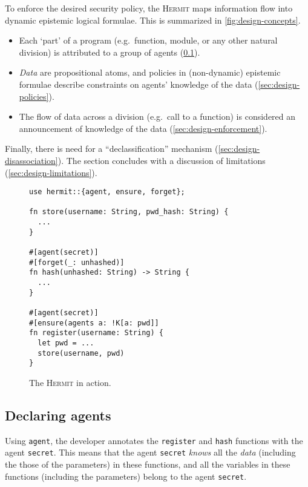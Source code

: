 \documentclass[letterpaper,twocolumn,10pt]{article}
\newcommand{\Hermit}{\textsc{Hermit}\xspace}
\begin{document}
To enforce the desired security policy, the \Hermit maps information flow into dynamic epistemic logical formulae.
This is summarized in \cref{fig:design-concepts}.
%
\begin{itemize}
  \item Each `part' of a program (e.g.\ function, module, or any other natural division) is attributed to a group of agents (\cref{sec:design-agents}).

  \item \emph{Data} are propositional atoms, and policies in (non-dynamic) epistemic formulae describe constraints on agents' knowledge of the data (\cref{sec:design-policies}).

  \item The flow of data across a division (e.g.\ call to a function) is considered an announcement of knowledge of the data (\cref{sec:design-enforcement}).
\end{itemize}
%
Finally, there is need for a ``declassification'' mechanism (\cref{sec:design-disassociation}).
The section concludes with a discussion of limitations (\cref{sec:design-limitations}).

\begin{figure}
  \centering
  \begin{lstlisting}
use hermit::{agent, ensure, forget};

fn store(username: String, pwd_hash: String) {
  ...
}

#[agent(secret)]
#[forget(_: unhashed)]
fn hash(unhashed: String) -> String {
  ...
}

#[agent(secret)]
#[ensure(agents a: !K[a: pwd]]
fn register(username: String) {
  let pwd = ...
  store(username, pwd)
}
  \end{lstlisting}
  \caption{The \Hermit in action.}
  \label{fig:design-example}
\end{figure}

\subsection{Declaring agents}
\label{sec:design-agents}

Using \lstinline{agent}, the developer annotates the \lstinline{register} and \lstinline{hash} functions with the agent \lstinline{secret}.
This means that the agent \lstinline{secret} \emph{knows} all the \emph{data} (including the those of the parameters) in these functions, and all the variables in these functions (including the parameters) belong to the agent \lstinline{secret}.
\end{document}

